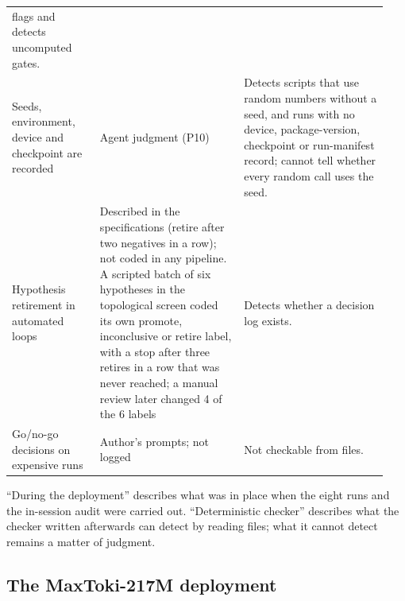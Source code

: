 \documentclass[10pt,letterpaper]{article}
\begin{document}
{\begin{longtable}{@{}p{0.22\linewidth}p{0.36\linewidth}p{0.36\linewidth}@{}}
flags and detects uncomputed gates. \\
Seeds, environment, device and checkpoint are recorded & Agent judgment
(P10) & Detects scripts that use random numbers without a seed, and runs
with no device, package-version, checkpoint or run-manifest record;
cannot tell whether every random call uses the seed. \\
Hypothesis retirement in automated loops & Described in the
specifications (retire after two negatives in a row); not coded in any
pipeline. A scripted batch of six hypotheses in the topological screen
coded its own promote, inconclusive or retire label, with a stop after
three retires in a row that was never reached; a manual review later
changed 4 of the 6 labels & Detects whether a decision log exists. \\
Go/no-go decisions on expensive runs & Author's prompts; not logged &
Not checkable from files. \\
\end{longtable}
\begin{flushleft}
``During
the deployment'' describes what was in place when the eight runs and the
in-session audit were carried out. ``Deterministic checker'' describes
what the checker written afterwards can detect by reading files; what it
cannot detect remains a matter of judgment.
\end{flushleft}
}


\subsection*{The MaxToki-217M deployment}
\end{document}
